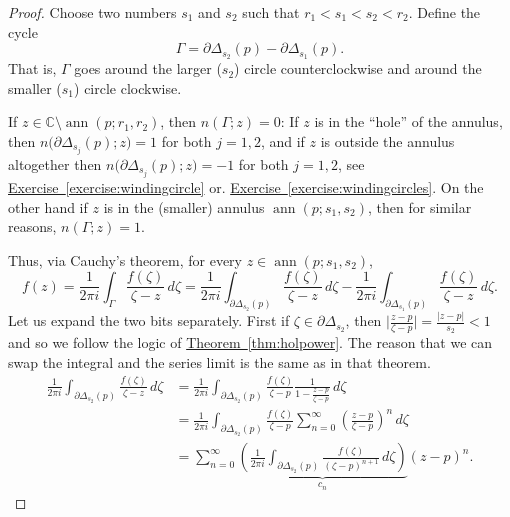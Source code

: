 \documentclass[12pt,openany]{book}
\newcommand{\ann}{\operatorname{ann}}
\newcommand{\sabs}[1]{\lvert {#1} \rvert}
\newcommand{\babs}[1]{\bigl\lvert {#1} \bigr\rvert}
\newcommand{\C}{{\mathbb{C}}}
\theoremstyle{plain}
\theoremstyle{remark}
\theoremstyle{definition}
\theoremstyle{exercise}
\theoremstyle{example}
\newcommand{\exerciseref}[1]{\hyperref[#1]{Exercise~\ref*{#1}}}
\newcommand{\thmref}[1]{\hyperref[#1]{Theorem~\ref*{#1}}}
\begin{document}
\begin{proof}
Choose two numbers $s_1$ and $s_2$ such that $r_1 < s_1 < s_2 < r_2$.
Define the cycle
\begin{equation*}
\Gamma = \partial \Delta_{s_2}(p) - \partial \Delta_{s_1}(p) .
\end{equation*}
That is, $\Gamma$ goes around the larger ($s_2$) circle counterclockwise and
around the smaller ($s_1$) circle clockwise.

If $z \in \C \setminus \ann(p;r_1,r_2)$, then $n(\Gamma;z) = 0$:
If $z$ is in the ``hole'' of the annulus, then
$n\bigl(\partial \Delta_{s_j}(p);z\bigr) = 1$ for both $j=1,2$, and 
if $z$ is outside the annulus altogether then
$n\bigl(\partial \Delta_{s_j}(p);z\bigr) = -1$ for both $j=1,2$,
see \exerciseref{exercise:windingcircle} or.
\exerciseref{exercise:windingcircles}.
On the other hand if $z$ is in the (smaller) annulus $\ann(p;s_1,s_2)$,
then for similar reasons, $n(\Gamma;z) = 1$.

Thus, via Cauchy's theorem, for every $z \in \ann(p;s_1,s_2)$,
\begin{equation*}
f(z) = 
\frac{1}{2\pi i}
\int_{\Gamma} \frac{f(\zeta)}{\zeta-z} \, d\zeta 
=
\frac{1}{2\pi i}
\int_{\partial \Delta_{s_2}(p)} \frac{f(\zeta)}{\zeta-z} \, d\zeta 
-
\frac{1}{2\pi i}
\int_{\partial \Delta_{s_1}(p)} \frac{f(\zeta)}{\zeta-z} \, d\zeta  .
\end{equation*}
Let us expand the two bits separately.  First
if $\zeta \in \partial \Delta_{s_2}$, then
$\babs{\frac{z-p}{\zeta-p}} = \frac{\sabs{z-p}}{s_2} < 1$ and so
we follow the logic of \thmref{thm:holpower}.  The reason that we can
swap the integral and the series limit is the same as in that theorem.
\begin{equation*}
\begin{split}
\frac{1}{2\pi i}
\int_{\partial \Delta_{s_2}(p)} \frac{f(\zeta)}{\zeta-z} \, d\zeta 
& =
\frac{1}{2\pi i}
\int_{\partial \Delta_{s_2}(p)} \frac{f(\zeta)}{\zeta-p}
\frac{1}{1-\frac{z-p}{\zeta-p}} \, d\zeta
\\
& =
\frac{1}{2\pi i}
\int_{\partial \Delta_{s_2}(p)} \frac{f(\zeta)}{\zeta-p}
\sum_{n=0}^\infty
{\left(\frac{z-p}{\zeta-p}\right)}^n \, d\zeta
\\
& =
\sum_{n=0}^\infty
\underbrace{
\left(
\frac{1}{2\pi i}
\int_{\partial \Delta_{s_2}(p)} \frac{f(\zeta)}{{(\zeta-p)}^{n+1}}
 \, d\zeta
\right)
}_{c_n}
{(z-p)}^n .
\end{split}
\end{equation*}


\end{proof}
\end{document}
